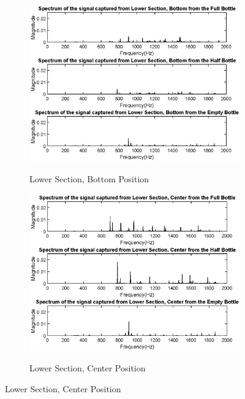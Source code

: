 \begin{figure}[]
    \centering
    \begin{subfigure}{0.45\textwidth}
        \centering
        \includegraphics[width=\linewidth]{Chapters/6CHP/Figures/LowBot.eps}
        \caption{Lower Section, Bottom Position}{}
        \label{subfig:LowBotMic}
    \end{subfigure}
    \begin{subfigure}{0.45\textwidth}
        \centering
        \includegraphics[width=\linewidth]{Chapters/6CHP/Figures/LowCenter.eps}
        \caption{Lower Section, Center Position}{}
        \label{subfig:LowCenMic}
    \end{subfigure}

\end{figure}
